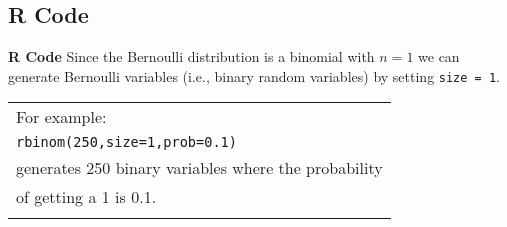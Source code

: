\documentclass[compress]{beamer}        %
\makeatletter
\newcommand{\tcb}{\textcolor{beamer@blendedblue}}
\makeatother
\begin{document}
\subsection{R Code}
\begin{frame}{\bf \tcb{R Code}}
Since the Bernoulli distribution is a binomial with $n=1$ we can generate Bernoulli variables (i.e., binary random variables) by setting \texttt{size = 1}.\\[0.4cm]

\begin{tabular}{|l|}
\hline
For example:\\[0.2cm]
\texttt{rbinom(250,size=1,prob=0.1)} \\
generates 250 binary variables where the probability\\
of getting a 1 is 0.1.\\
\hline
\multicolumn{1}{c}{}\\[0.0cm]
\end{tabular}


\end{frame}










%
%
%
%
%
\end{document}
